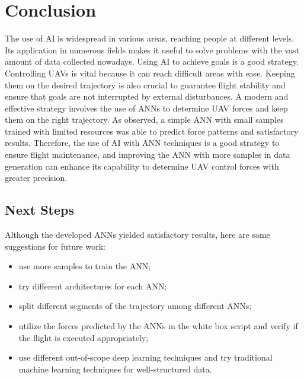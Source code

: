 \chapter{Conclusion}\label{sec:conclusion}

The use of AI is widespread in various areas, reaching people at different levels. 
Its application in numerous fields makes it useful to solve problems with the vast amount of data collected nowadays.
Using AI to achieve goals is a good strategy. 
Controlling UAVs is vital because it can reach difficult areas with ease.
Keeping them on the desired trajectory is also crucial to guarantee flight stability and ensure that goals are not interrupted by external disturbances. 
A modern and effective strategy involves the use of ANNs to determine UAV forces and keep them on the right trajectory.
As observed, a simple ANN with small samples trained with limited resources was able to predict force patterns and satisfactory results.
Therefore, the use of AI with ANN techniques is a good strategy to ensure flight maintenance, and improving the ANN with more samples in data generation can enhance its capability to determine UAV control forces with greater precision.

\section{Next Steps}

Although the developed ANNs yielded satisfactory results, here are some suggestions for future work:

\begin{itemize}
    \item use more samples to train the ANN;
    \item try different architectures for each ANN;
    \item split different segments of the trajectory among different ANNs;
    \item utilize the forces predicted by the ANNs in the white box script and verify if the flight is executed appropriately;
    \item use different out-of-scope deep learning techniques and try traditional machine learning techniques for well-structured data.
\end{itemize}